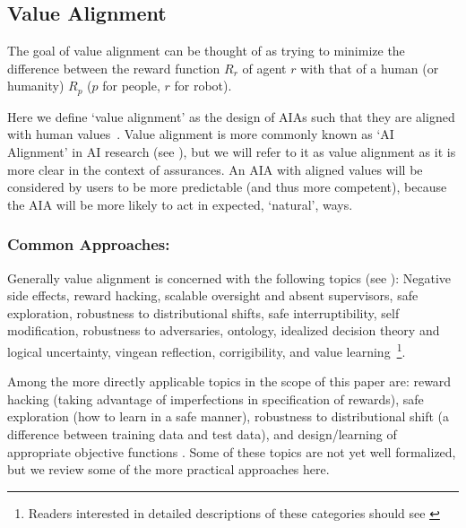 \subsection{Value Alignment} \label{sec:value_alignment}
The goal of value alignment can be thought of as trying to minimize the difference between the reward function $R_r$ of agent $r$ with that of a human (or humanity) $R_p$ ($p$ for people, $r$ for robot). 

Here we define `value alignment' as the design of AIAs such that they are aligned with human values~\cite{Gordon_Worley2018-xy}. Value alignment is more commonly known as `AI Alignment' in AI research (see \cite{Yudkowsky2001-hb,Bensinger2014-ul}), but we will refer to it as value alignment as it is more clear in the context of assurances. An AIA with aligned values will be considered by users to be more predictable (and thus more competent), because the AIA will be more likely to act in expected, `natural', ways.


\subsubsection{Common Approaches:}
Generally value alignment is concerned with the following topics (see \cite{Gordon_Worley2018-xy,Amodei2016-xi}): Negative side effects, reward hacking, scalable oversight and absent supervisors, safe exploration, robustness to distributional shifts, safe interruptibility, self modification, robustness to adversaries, ontology, idealized decision theory and logical uncertainty, vingean reflection, corrigibility, and value learning~\footnote{Readers interested in detailed descriptions of these categories should see \cite{Gordon_Worley2018-xy,Amodei2016-xi}}.

Among the more directly applicable topics in the scope of this paper are: reward hacking (taking advantage of imperfections in specification of rewards), safe exploration (how to learn in a safe manner), robustness to distributional shift (a difference between training data and test data), and design/learning of appropriate objective functions \cite{Hadfield-Menell2016-ws,Da_Veiga2012-gh,Garcia2015-rs}. Some of these topics are not yet well formalized, but we review some of the more practical approaches here.


